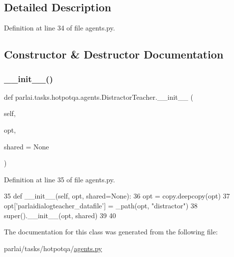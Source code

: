 \subsection{Detailed Description}


Definition at line 34 of file agents.\+py.



\subsection{Constructor \& Destructor Documentation}
\mbox{\label{classparlai_1_1tasks_1_1hotpotqa_1_1agents_1_1DistractorTeacher_a933e9ee4fe9a8557477562a9a05d598c}} 
\subsubsection{\texorpdfstring{\+\_\+\+\_\+init\+\_\+\+\_\+()}{\_\_init\_\_()}}
{\footnotesize\ttfamily def parlai.\+tasks.\+hotpotqa.\+agents.\+Distractor\+Teacher.\+\_\+\+\_\+init\+\_\+\+\_\+ (\begin{DoxyParamCaption}\item[{}]{self,  }\item[{}]{opt,  }\item[{}]{shared = {\ttfamily None} }\end{DoxyParamCaption})}



Definition at line 35 of file agents.\+py.


\begin{DoxyCode}
35     \textcolor{keyword}{def }\_\_init\_\_(self, opt, shared=None):
36         opt = copy.deepcopy(opt)
37         opt[\textcolor{stringliteral}{'parlaidialogteacher\_datafile'}] = \_path(opt, \textcolor{stringliteral}{"distractor"})
38         super().\_\_init\_\_(opt, shared)
39 
40 
\end{DoxyCode}


The documentation for this class was generated from the following file\+:\begin{DoxyCompactItemize}
\item 
parlai/tasks/hotpotqa/\hyperlink{parlai_2tasks_2hotpotqa_2agents_8py}{agents.\+py}\end{DoxyCompactItemize}

